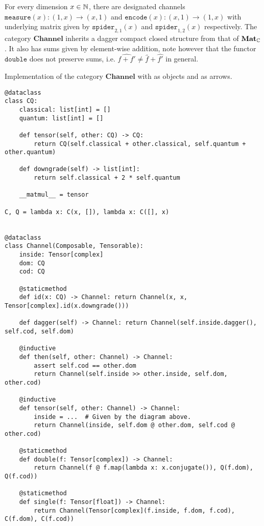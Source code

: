For every dimension $x \in \mathbb{N}$, there are designated channels $\mathtt{measure}(x) : (1, x) \to (x, 1)$ and $\mathtt{encode}(x) : (x, 1) \to (1, x)$ with underlying matrix given by $\mathtt{spider}_{2, 1}(x)$ and $\mathtt{spider}_{1, 2}(x)$ respectively.
The category $\mathbf{Channel}$ inherits a dagger compact closed structure from that of $\mathbf{Mat}_{\mathbb{C}}$.
It also has sums given by element-wise addition, note however that the functor $\mathtt{double}$ does not preserve sums, i.e. $\widehat{f + f'} \neq \widehat{f} + \widehat{f'}$ in general.

\begin{python}
{\normalfont Implementation of the category $\mathbf{Channel}$ with  as objects and  as arrows.}

\begin{verbatim}
@dataclass
class CQ:
    classical: list[int] = []
    quantum: list[int] = []

    def tensor(self, other: CQ) -> CQ:
        return CQ(self.classical + other.classical, self.quantum + other.quantum)

    def downgrade(self) -> list[int]:
        return self.classical + 2 * self.quantum

    __matmul__ = tensor

C, Q = lambda x: C(x, []), lambda x: C([], x)


@dataclass
class Channel(Composable, Tensorable):
    inside: Tensor[complex]
    dom: CQ
    cod: CQ

    @staticmethod
    def id(x: CQ) -> Channel: return Channel(x, x, Tensor[complex].id(x.downgrade()))

    def dagger(self) -> Channel: return Channel(self.inside.dagger(), self.cod, self.dom)

    @inductive
    def then(self, other: Channel) -> Channel:
        assert self.cod == other.dom
        return Channel(self.inside >> other.inside, self.dom, other.cod)

    @inductive
    def tensor(self, other: Channel) -> Channel:
        inside = ...  # Given by the diagram above.
        return Channel(inside, self.dom @ other.dom, self.cod @ other.cod)

    @staticmethod
    def double(f: Tensor[complex]) -> Channel:
        return Channel(f @ f.map(lambda x: x.conjugate()), Q(f.dom), Q(f.cod))

    @staticmethod
    def single(f: Tensor[float]) -> Channel:
        return Channel(Tensor[complex](f.inside, f.dom, f.cod), C(f.dom), C(f.cod))


\end{verbatim}
\end{python}
